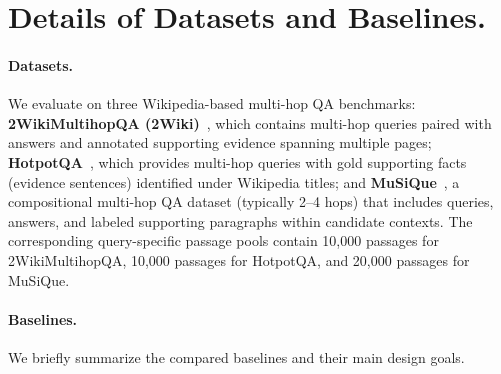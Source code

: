 \documentclass{article}
\theoremstyle{plain}
\theoremstyle{definition}
\theoremstyle{remark}
\begin{document}






\section{Details of Datasets and Baselines.}
\label{app:detail}
\paragraph{Datasets.}
We evaluate on three Wikipedia-based multi-hop QA benchmarks: \textbf{2WikiMultihopQA (2Wiki)}~\cite{2wiki}, which contains multi-hop queries paired with answers and annotated supporting evidence spanning multiple pages; \textbf{HotpotQA}~\cite{hotpotqa}, which provides multi-hop queries with gold supporting facts (evidence sentences) identified under Wikipedia titles; and \textbf{MuSiQue}~\cite{Musique}, a compositional multi-hop QA dataset (typically 2--4 hops) that includes queries, answers, and labeled supporting paragraphs within candidate contexts. The corresponding query-specific passage pools contain 10,000 passages for 2WikiMultihopQA, 10,000 passages for HotpotQA, and 20,000 passages for MuSiQue.


\paragraph{Baselines.}

We briefly summarize the compared baselines and their main design goals.
\end{document}
